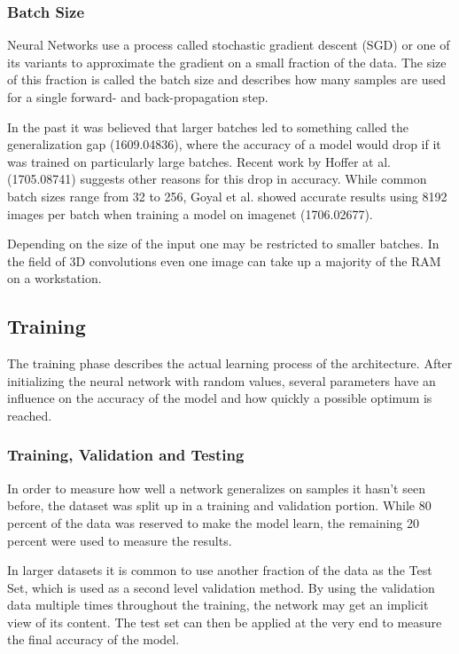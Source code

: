 \subsubsection{Batch Size}

Neural Networks use a process called stochastic gradient descent (SGD) or one of its variants to approximate the gradient on a small fraction of the data. The size of this fraction is called the batch size and describes how many samples are used for a single forward- and back-propagation step.

In the past it was believed that larger batches led to something called the generalization gap (1609.04836), where the accuracy of a model would drop if it was trained on particularly large batches. Recent work by Hoffer at al. (1705.08741) suggests other reasons for this drop in accuracy. While common batch sizes range from 32 to 256, Goyal et al. showed accurate results using 8192 images per batch when training a model on imagenet (1706.02677).

Depending on the size of the input one may be restricted to smaller batches. In the field of 3D convolutions even one image can take up a majority of the RAM on a workstation.

\subsection{Training}

The training phase describes the actual learning process of the architecture. After initializing the neural network with random values, several parameters have an influence on the accuracy of the model and how quickly a possible optimum is reached.

\subsubsection{Training, Validation and Testing}

In order to measure how well a network generalizes on samples it hasn't seen before, the dataset was split up in a training and validation portion. While 80 percent of the data was reserved to make the model learn, the remaining 20 percent were used to measure the results.

In larger datasets it is common to use another fraction of the data as the Test Set, which is used as a second level validation method. By using the validation data multiple times throughout the training, the network may get an implicit view of its content. The test set can then be applied at the very end to measure the final accuracy of the model.

